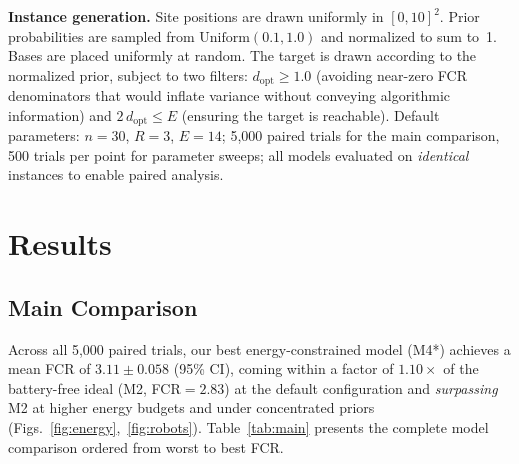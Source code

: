 \documentclass[conference]{IEEEtran}
\begin{document}
\textbf{Instance generation.}
Site positions are drawn uniformly in $[0,10]^2$.
Prior probabilities are sampled from $\mathrm{Uniform}(0.1,1.0)$ and
normalized to sum to~1.
Bases are placed uniformly at random.
The target is drawn according to the normalized prior, subject to two filters:
$d_{\mathrm{opt}} \geq 1.0$ (avoiding near-zero FCR denominators that would
inflate variance without conveying algorithmic information) and
$2\,d_{\mathrm{opt}} \leq E$ (ensuring the target is reachable).
Default parameters: $n=30$, $R=3$, $E=14$; 5,000 paired trials for the main
comparison, 500 trials per point for parameter sweeps; all models evaluated on
\emph{identical} instances to enable paired analysis.

\section{Results}\label{sec:results}

\subsection{Main Comparison}

Across all 5,000 paired trials, our best energy-constrained model (M4*)
achieves a mean FCR of $3.11 \pm 0.058$ (95\% CI), coming within a factor
of $1.10\times$ of the battery-free ideal (M2, FCR$=2.83$) at the default
configuration and \emph{surpassing} M2 at higher energy budgets and under
concentrated priors (Figs.~\ref{fig:energy},~\ref{fig:robots}).
Table~\ref{tab:main} presents the complete model comparison ordered from
worst to best FCR.
\end{document}
